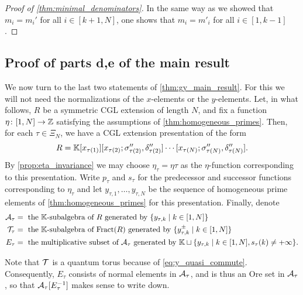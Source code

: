 \begin{proof}[Proof of \cref{thm:minimal_denominators}]
	In the same way as we showed that $m_i = m_i'$ for all $i \in [k+1, N]$, one shows that
	$m_i = m'_i$ for all $i \in [1, k-1]$.
\end{proof}

\subsection{Proof of parts d,e of the main result}

We now turn to the last two statements of \cref{thm:gy_main_result}. For this we will
not need the normalizations of the $x$-elements or the $y$-elements. Let, in what
follows, $R$ be a symmetric CGL extension of length $N$, and fix a function $\eta
	\colon [1, N] \to \mathbb{Z}$ satisfying the assumptions of \cref{thm:homogeneous_primes}.
Then, for each $\tau \in \Xi_N$, we have a CGL extension presentation of the form
\begin{equation*}
	R = \mathbb{K}[x_{\tau(1)}][x_{\tau(2)}; \sigma''_{\tau(2)}, \delta''_{\tau(2)}] \cdots [x_{\tau(N)}; \sigma''_{\tau(N)}, \delta''_{\tau(N)}].
\end{equation*}
%
By \cref{prop:eta_invariance} we may choose $\eta_\tau = \eta\tau$ as the
$\eta$-function corresponding to this presentation. Write $p_\tau$ and $s_\tau$ for the
predecessor and successor functions corresponding to $\eta_\tau$ and let $y_{\tau, 1},
	\dots, y_{\tau, N}$ be the sequence of homogeneous prime elements of
\cref{thm:homogeneous_primes} for this presentation. Finally, denote
\begin{align*}
	\mathcal{A}_\tau & = \text{ the $\mathbb{K}$-subalgebra of $R$ generated by } \{y_{\tau, k} \mid k \in [1, N]\}                                                   \\
	\mathcal{T}_\tau & = \text{ the $\mathbb{K}$-subalgebra of $\operatorname{Fract}(R)$ generated by } \{y_{\tau, k}^{\pm} \mid k \in [1, N]\}                                     \\
	E_\tau    & = \text{ the multiplicative subset of $\mathcal{A}_\tau$ generated by } \mathbb{K} \sqcup \{y_{\tau, k} \mid k \in [1, N], s_\tau(k) \neq + \infty\}.
\end{align*}

Note that $\mathcal{T}$ is a quantum torus because of \cref{eq:y_quasi_commute}. Consequently,
$E_\tau$ consists of normal elements in $\mathcal{A}_\tau$, and is thus an Ore set in
$\mathcal{A}_\tau$, so that $\mathcal{A}_\tau[E^{-1}_\tau]$ makes sense to write down.

